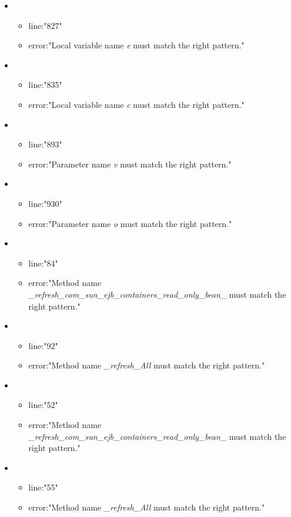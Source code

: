 \begin{itemize}
\begin{itemize}
	\end{itemize}
	\item 
	\begin{itemize} 
		\item line:"827" 
		\item error:"Local variable name \emph{e} must match the right pattern." 
	\end{itemize}
	\item 
	\begin{itemize} 
		\item line:"835" 
		\item error:"Local variable name \emph{c} must match the right pattern." 
	\end{itemize}
	\item 
	\begin{itemize} 
		\item line:"893" 
		\item error:"Parameter name \emph{v} must match the right pattern." 
	\end{itemize}
	\item 
	\begin{itemize} 
		\item line:"930" 
		\item error:"Parameter name \emph{o} must match the right pattern." 
	\end{itemize}
	\item 
	\begin{itemize} 
		\item line:"84" 
		\item error:"Method name \emph{\_refresh\_com\_sun\_ejb\_containers\_read\_only\_bean\_} must match the right pattern." 
	\end{itemize}
	\item 
	\begin{itemize} 
		\item line:"92" 
		\item error:"Method name \emph{\_refresh\_All} must match the right pattern." 
	\end{itemize}
	\item 
	\begin{itemize} 
		\item line:"52" 
		\item error:"Method name \emph{\_refresh\_com\_sun\_ejb\_containers\_read\_only\_bean\_} must match the right pattern." 
	\end{itemize}
	\item 
	\begin{itemize} 
		\item line:"55" 
		\item error:"Method name \emph{\_refresh\_All} must match the right pattern." 


	\end{itemize}
\end{itemize}
